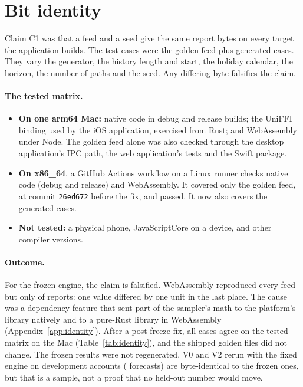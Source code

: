 \section{Bit identity}
\label{sec:identity}

Claim C1 was that a feed and a seed give the same report bytes on every
target the application builds. The test cases were the golden feed plus
 generated cases. They vary the
generator, the history length and start, the holiday calendar, the
horizon, the number of paths and the seed. Any differing byte falsifies
the claim.

\paragraph{The tested matrix.}
\begin{itemize}
\item \textbf{On one arm64 Mac:} native code in debug and release builds;
  the UniFFI binding used by the iOS application, exercised from Rust; and
  WebAssembly under Node. The golden feed alone was also checked through
  the desktop application's IPC path, the web application's tests and the
  Swift package.
\item \textbf{On x86\_64}, a GitHub Actions workflow on a Linux runner
  checks native code (debug and release) and WebAssembly. It covered only
  the golden feed, at commit \texttt{26ed672} before the fix, and passed.
  It now also covers the generated cases. 
\item \textbf{Not tested:} a physical phone, JavaScriptCore on a device,
  and other compiler versions.
\end{itemize}

\paragraph{Outcome.} For the frozen engine, the claim is falsified.
WebAssembly reproduced every feed but only
 of
 reports: one value differed by one
unit in the last place. The cause was a dependency feature that sent part
of the sampler's math to the platform's library natively and to a
pure-Rust library in WebAssembly (Appendix~\ref{app:identity}). After a
post-freeze fix, all  cases agree on
the tested matrix on the Mac (Table~\ref{tab:identity}), and the shipped
golden files did not change. The frozen results were not regenerated. V0
and V2 rerun with the fixed engine on  development
accounts ( forecasts) are byte-identical to the frozen
ones, but that is a sample, not a proof that no held-out number would
move.

\begin{table}[t]
\centering\footnotesize
{}
\caption{Bit identity on one arm64 Mac, for the frozen engine and after the
post-freeze fix. The native debug build wrote the manifest, so its row
agrees by construction; every other leg is checked against it.}
\label{tab:identity}
\end{table}
